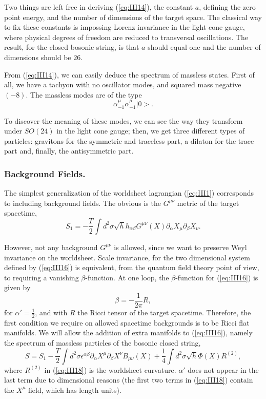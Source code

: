 Two things are left free in deriving (\ref{eq:III14}), the
constant $a$, defining the zero point energy, and the number of
dimensions of the target space. The classical way to fix these
constants is impossing Lorenz invariance in the light cone gauge,
where physical degrees of freedom are reduced to transversal
oscillations. The result, for the closed bosonic string, is that
$a$ should equal one and the number of dimensions should be $26$. 
  
From (\ref{eq:III14}), we can easily deduce the spectrum of
massless states. First of all, we have a tachyon with no
oscillator modes, and squared mass negative $(-8)$. The massless
modes are of the type
\begin{equation}
\alpha_{-1}^{\mu} \alpha_{-1}^{\mu} |0>.
\label{eq:III15}
\end{equation}
  
To discover the meaning of these modes, we can see the way they
transform under $SO(24)$ in the light cone gauge; then, we get
three different types of particles: gravitons for the symmetric
and traceless part, a dilaton for the trace part and, finally,
the antisymmetric part.

\subsubsection{Background Fields.}

The simplest generalization of the worldsheet lagrangian
(\ref{eq:III1}) corresponds to including background fields. The
obvious is the $G^{\mu \nu}$ metric of the target spacetime,
\begin{equation}
S_1=- \frac {T}{2} \int d^2\sigma \sqrt{h} h_{\alpha \beta}
G^{\mu \nu} (X) \partial_{\alpha} X_{\mu} \partial_{\beta}
X_{\nu}.
\label{eq:III16}
\end{equation}
  
However, not any background $G^{\mu \nu}$ is allowed, since we
want to preserve Weyl invariance on the worldsheet. Scale
invariance, for the two dimensional system defined by
(\ref{eq:III16}) is equivalent, from the quantum field theory
point of view, to requiring a vanishing $\beta$-function. At one
loop, the $\beta$-function for (\ref{eq:III16}) is given by
\begin{equation}
\beta = - \frac {1}{2\pi} R,
\label{eq:III17}
\end{equation}
for $\alpha'=\frac {1}{2}$, and with $R$ the Ricci tensor of the
target spacetime. Therefore, the first condition we require on
allowed spacetime backgrounds is to be Ricci flat manifolds. We
will allow the addition of extra manifolds to (\ref{eq:III16}), namely the
spectrum of massless particles of the bosonic closed string,
\begin{equation}
S=S_1 - \frac {T}{2} \int d^2\sigma \epsilon^{\alpha \beta}
\partial_{\alpha} X^{\mu} \partial_{\beta} X^{\nu} B_{\mu \nu}(X)
+ \frac {1}{4} \int d^2 \sigma \sqrt{h} \Phi(X) R^{(2)},
\label{eq:III18}
\end{equation}
where $R^{(2)}$ in (\ref{eq:III18}) is the worldsheet curvature.
$\alpha'$ does not appear in the last term due to dimensional
reasons (the first two terms in (\ref{eq:III18}) contain the
$X^{\mu}$ field, which has length units). 
  
